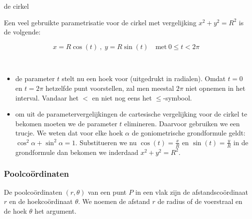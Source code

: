 \begin{voorbeeld}
	de cirkel

Een veel gebruikte parametrisatie voor de cirkel met vergelijking
$x^{2}+y^{2}=R^{2}$ is de volgende:

\begin{equation*}
x=R\cos(t)\:,\;y=R\sin(t)\quad\textrm{met}\:0\leq t<2\pi
\end{equation*}

\begin{opmerking}
	\ \\
	\begin{itemize}
\item de parameter $t$ stelt nu een hoek voor (uitgedrukt in radialen).
Omdat $t=0$ en $t=2\pi$ hetzelfde punt voorstellen, zal men meestal
$2\pi$ niet opnemen in het interval. Vandaar het $<$ en niet nog
eens het $\leq$-symbool.
\item om uit de parametervergelijkingen de cartesische vergelijking voor
de cirkel te bekomen moeten we de parameter $t$ elimineren. Daarvoor
gebruiken we een trucje. We weten dat voor elke hoek $\alpha$ de
goniometrische grondformule geldt: $\cos^{2}\alpha+\sin^{2}\alpha=1$.
Substitueren we nu $\cos(t)=\frac{x}{R}$ en $\sin(t)=\frac{y}{R}$
in de grondformule dan bekomen we inderdaad $x^{2}+y^{2}=R^{2}$.
\end{itemize}

\end{opmerking}
\end{voorbeeld}


\subsubsection{Poolco\"ordinaten}

De poolco\"ordinaten $\left(r,\theta\right)$ van een punt $P$ in een
vlak zijn de afstandsco\"ordinaat $r$ en de hoekco\"ordinaat $\theta$.
We noemen de afstand $r$ de radius of de voerstraal en de hoek $\theta$
het argument.


\begin{center}
	
\end{center}

